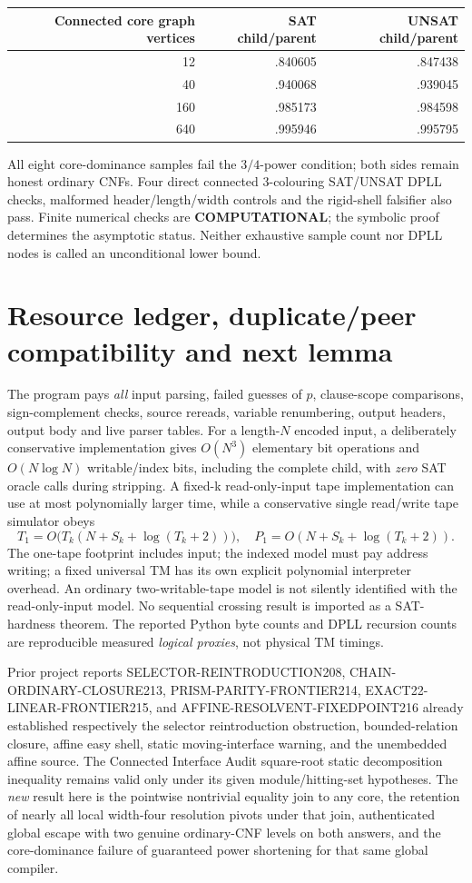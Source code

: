 \documentclass[11pt]{article}
\begin{document}
\begin{center}\small\begin{tabular}{rrr}\toprule
Connected core graph vertices & SAT child/parent & UNSAT child/parent\\\midrule
12 & .840605 & .847438\\
40 & .940068 & .939045\\
160 & .985173 & .984598\\
640 & .995946 & .995795\\\bottomrule
\end{tabular}\end{center}
All eight core-dominance samples fail the $3/4$-power condition; both sides remain honest ordinary CNFs. Four direct connected 3-colouring SAT/UNSAT DPLL checks, malformed header/length/width controls and the rigid-shell falsifier also pass. Finite numerical checks are \textbf{COMPUTATIONAL}; the symbolic proof determines the asymptotic status. Neither exhaustive sample count nor DPLL nodes is called an unconditional lower bound.

\section{Resource ledger, duplicate/peer compatibility and next lemma}
The program pays \emph{all} input parsing, failed guesses of $p$, clause-scope comparisons, sign-complement checks, source rereads, variable renumbering, output headers, output body and live parser tables. For a length-$N$ encoded input, a deliberately conservative implementation gives $O(N^3)$ elementary bit operations and $O(N\log N)$ writable/index bits, including the complete child, with \emph{zero} SAT oracle calls during stripping. A fixed-k read-only-input tape implementation can use at most polynomially larger time, while a conservative single read/write tape simulator obeys
\[
T_1=O\bigl(T_k(N+S_k+\log(T_k+2))\bigr),\quad
P_1=O(N+S_k+\log(T_k+2)).
\]
The one-tape footprint includes input; the indexed model must pay address writing; a fixed universal TM has its own explicit polynomial interpreter overhead. An ordinary two-writable-tape model is not silently identified with the read-only-input model. No sequential crossing result is imported as a SAT-hardness theorem. The reported Python byte counts and DPLL recursion counts are reproducible measured \emph{logical proxies}, not physical TM timings.

Prior project reports SELECTOR-REINTRODUCTION208, CHAIN-ORDINARY-CLOSURE213, PRISM-PARITY-FRONTIER214, EXACT22-LINEAR-FRONTIER215, and AFFINE-RESOLVENT-FIXEDPOINT216 already established respectively the selector reintroduction obstruction, bounded-relation closure, affine easy shell, static moving-interface warning, and the unembedded affine source. The Connected Interface Audit square-root static decomposition inequality remains valid only under its given module/hitting-set hypotheses. The \emph{new} result here is the pointwise nontrivial equality join to any core, the retention of nearly all local width-four resolution pivots under that join, authenticated global escape with two genuine ordinary-CNF levels on both answers, and the core-dominance failure of guaranteed power shortening for that same global compiler.
\end{document}
